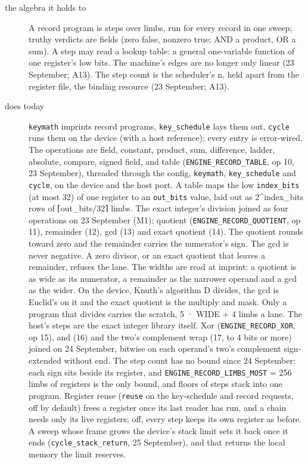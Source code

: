 \begin{description}
\item[{the algebra it holds to}] A record program is steps over limbs, run for every record in one sweep; truthy verdicts are fields (zero false, nonzero true; AND a product, OR a sum). A step may read a lookup table: a general one-variable function of one register's low bits. The machine's edges are no longer only linear (23 September; A13). The step count is the scheduler's n, held apart from the register file, the binding resource (23 September; A13).
\item[{does today}] \texttt{keymath} imprints record programs, \texttt{key\_\allowbreak{}schedule} lays them out, \texttt{cycle} runs them on the device (with a host reference); every entry is error-wired. The operations are field, constant, product, sum, difference, ladder, absolute, compare, signed field, and table (\texttt{ENGINE\_\allowbreak{}RECORD\_\allowbreak{}TABLE}, op 10, 23 September), threaded through the config, \texttt{keymath}, \texttt{key\_\allowbreak{}schedule} and \texttt{cycle}, on the device and the host port. A table maps the low \texttt{index\_\allowbreak{}bits} (at most 32) of one register to an \texttt{out\_\allowbreak{}bits} value, laid out as 2\textasciicircum{}index\_\allowbreak{}bits rows of ⌈out\_\allowbreak{}bits/32⌉ limbs. The exact integer's division joined as four operations on 23 September (M1): quotient (\texttt{ENGINE\_\allowbreak{}RECORD\_\allowbreak{}QUOTIENT}, op 11), remainder (12), gcd (13) and exact quotient (14). The quotient rounds toward zero and the remainder carries the numerator's sign. The gcd is never negative. A zero divisor, or an exact quotient that leaves a remainder, refuses the lane. The widths are read at imprint: a quotient is as wide as its numerator, a remainder as the narrower operand and a gcd as the wider. On the device, Knuth's algorithm D divides, the gcd is Euclid's on it and the exact quotient is the multiply and mask. Only a program that divides carries the scratch, 5 · WIDE + 4 limbs a lane. The host's steps are the exact integer library itself. Xor (\texttt{ENGINE\_\allowbreak{}RECORD\_\allowbreak{}XOR}, op 15), and (16) and the two's complement wrap (17, to 4 bits or more) joined on 24 September, bitwise on each operand's two's complement sign-extended without end. The step count has no bound since 24 September: each sign sits beside its register, and \texttt{ENGINE\_\allowbreak{}RECORD\_\allowbreak{}LIMBS\_\allowbreak{}MOST} = 256 limbs of registers is the only bound, and floors of steps stack into one program. Register reuse (\texttt{reuse} on the key-schedule and record requests, off by default) frees a register once its last reader has run, and a chain needs only its live registers; off, every step keeps its own register as before. A sweep whose frame grows the device's stack limit sets it back once it ends (\texttt{cycle\_\allowbreak{}stack\_\allowbreak{}return}, 25 September), and that returns the local memory the limit reserves.

\end{description}
